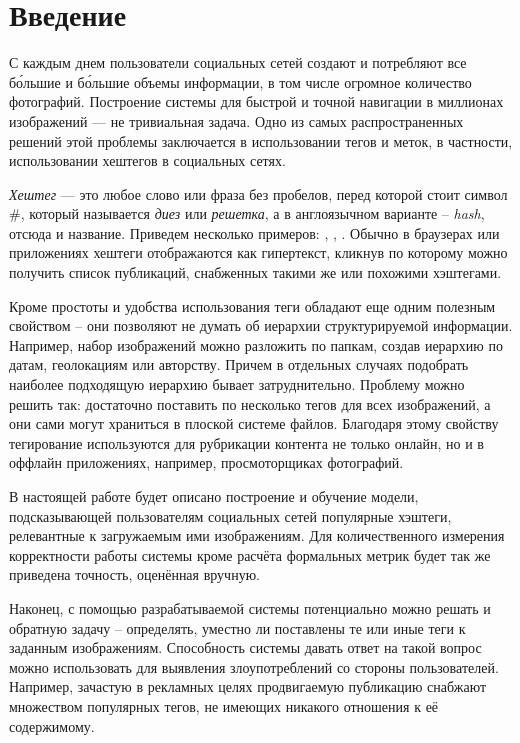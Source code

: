 \section*{Введение}

\indent
\indent
С каждым днем пользователи социальных сетей создают и потребляют все б\'{о}льшие
и б\'{о}льшие объемы информации, в том числе огромное количество фотографий.
Построение системы для быстрой и точной навигации в миллионах изображений
 --- не тривиальная задача. Одно из самых распространенных решений этой
 проблемы заключается в использовании тегов и меток, в частности,
 использовании хештегов в социальных сетях.


\indent
\textit{Хештег} --- это любое слово или фраза без пробелов, перед которой стоит 
символ \#, который называется \textit{диез} или \textit{решетка}, а в англоязычном 
варианте -- \textit{hash}, отсюда и название. Приведем несколько примеров:
, , . Обычно в браузерах или 
приложениях хештеги отображаются как гипертекст, кликнув по которому можно 
получить список публикаций, снабженных такими же или похожими хэштегами.


\indent
Кроме простоты и удобства использования теги обладают еще одним полезным свойством 
-- они позволяют не думать об  иерархии структурируемой информации. 
Например, набор изображений можно разложить
по папкам, создав иерархию по датам, геолокациям или авторству. Причем в отдельных
случаях подобрать наиболее подходящую иерархию бывает затруднительно. Проблему
можно решить так: достаточно поставить по несколько тегов для всех изображений,
а они сами могут храниться в плоской системе файлов.
Благодаря этому свойству тегирование используются  для рубрикации контента 
не только онлайн, но и в оффлайн приложениях, например, 
просмоторщиках фотографий. 


\indent 
В настоящей работе будет описано построение и обучение модели, подсказывающей 
пользователям социальных сетей популярные хэштеги, релевантные к загружаемым
ими изображениям. Для количественного измерения корректности работы системы 
кроме расчёта формальных метрик будет так же приведена точность,
оценённая вручную.


\indent
Наконец, с помощью разрабатываемой системы потенциально можно решать и 
обратную задачу -- определять,
уместно ли поставлены те или иные теги к заданным изображениям. 
Способность системы давать ответ на такой вопрос можно использовать для 
выявления злоупотреблений со стороны пользователей. Например, зачастую
 в рекламных целях продвигаемую публикацию снабжают множеством популярных 
тегов, не имеющих никакого отношения к её содержимому.
 
 